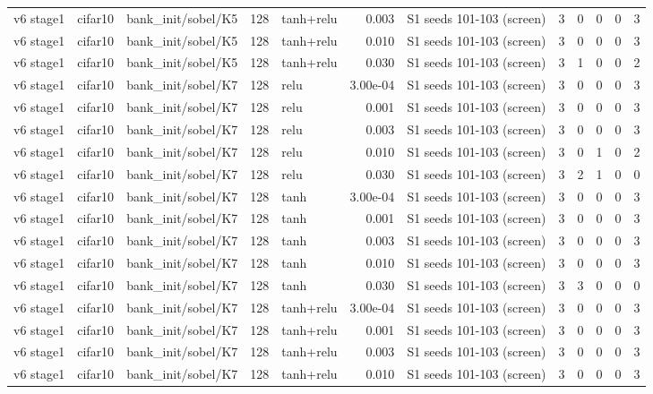 \begin{table}[htbp]
{\begin{tabular}{@{}lllrlrlrrrrr@{}}
v6 stage1 & cifar10 & bank\_init/sobel/K5 & 128 & tanh+relu & 0.003 & S1 seeds 101-103 (screen) & 3 & 0 & 0 & 0 & 3 \\
v6 stage1 & cifar10 & bank\_init/sobel/K5 & 128 & tanh+relu & 0.010 & S1 seeds 101-103 (screen) & 3 & 0 & 0 & 0 & 3 \\
v6 stage1 & cifar10 & bank\_init/sobel/K5 & 128 & tanh+relu & 0.030 & S1 seeds 101-103 (screen) & 3 & 1 & 0 & 0 & 2 \\
v6 stage1 & cifar10 & bank\_init/sobel/K7 & 128 & relu & 3.00e-04 & S1 seeds 101-103 (screen) & 3 & 0 & 0 & 0 & 3 \\
v6 stage1 & cifar10 & bank\_init/sobel/K7 & 128 & relu & 0.001 & S1 seeds 101-103 (screen) & 3 & 0 & 0 & 0 & 3 \\
v6 stage1 & cifar10 & bank\_init/sobel/K7 & 128 & relu & 0.003 & S1 seeds 101-103 (screen) & 3 & 0 & 0 & 0 & 3 \\
v6 stage1 & cifar10 & bank\_init/sobel/K7 & 128 & relu & 0.010 & S1 seeds 101-103 (screen) & 3 & 0 & 1 & 0 & 2 \\
v6 stage1 & cifar10 & bank\_init/sobel/K7 & 128 & relu & 0.030 & S1 seeds 101-103 (screen) & 3 & 2 & 1 & 0 & 0 \\
v6 stage1 & cifar10 & bank\_init/sobel/K7 & 128 & tanh & 3.00e-04 & S1 seeds 101-103 (screen) & 3 & 0 & 0 & 0 & 3 \\
v6 stage1 & cifar10 & bank\_init/sobel/K7 & 128 & tanh & 0.001 & S1 seeds 101-103 (screen) & 3 & 0 & 0 & 0 & 3 \\
v6 stage1 & cifar10 & bank\_init/sobel/K7 & 128 & tanh & 0.003 & S1 seeds 101-103 (screen) & 3 & 0 & 0 & 0 & 3 \\
v6 stage1 & cifar10 & bank\_init/sobel/K7 & 128 & tanh & 0.010 & S1 seeds 101-103 (screen) & 3 & 0 & 0 & 0 & 3 \\
v6 stage1 & cifar10 & bank\_init/sobel/K7 & 128 & tanh & 0.030 & S1 seeds 101-103 (screen) & 3 & 3 & 0 & 0 & 0 \\
v6 stage1 & cifar10 & bank\_init/sobel/K7 & 128 & tanh+relu & 3.00e-04 & S1 seeds 101-103 (screen) & 3 & 0 & 0 & 0 & 3 \\
v6 stage1 & cifar10 & bank\_init/sobel/K7 & 128 & tanh+relu & 0.001 & S1 seeds 101-103 (screen) & 3 & 0 & 0 & 0 & 3 \\
v6 stage1 & cifar10 & bank\_init/sobel/K7 & 128 & tanh+relu & 0.003 & S1 seeds 101-103 (screen) & 3 & 0 & 0 & 0 & 3 \\
v6 stage1 & cifar10 & bank\_init/sobel/K7 & 128 & tanh+relu & 0.010 & S1 seeds 101-103 (screen) & 3 & 0 & 0 & 0 & 3 \\

\end{tabular}}
\end{table}
